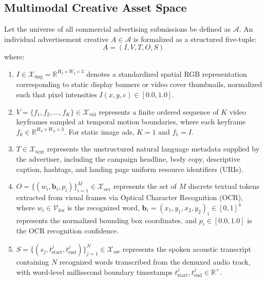 \documentclass[12pt,a4paper]{report}
\begin{document}
\subsection{Multimodal Creative Asset Space}
Let the universe of all commercial advertising submissions be defined as $\mathcal{A}$. An individual advertisement creative $A \in \mathcal{A}$ is formalized as a structured five-tuple:
\begin{equation}
A = \left( I, V, T, O, S \right)
\end{equation}
where:
\begin{enumerate}
    \item $I \in \mathcal{X}_{\text{img}} = \mathbb{R}^{H_I \times W_I \times 3}$ denotes a standardized spatial RGB representation corresponding to static display banners or video cover thumbnails, normalized such that pixel intensities $I(x,y,c) \in [0.0, 1.0]$.
    \item $V = \{f_1, f_2, \dots, f_K\} \in \mathcal{X}_{\text{vid}}$ represents a finite ordered sequence of $K$ video keyframes sampled at temporal motion boundaries, where each keyframe $f_k \in \mathbb{R}^{H_V \times W_V \times 3}$. For static image ads, $K=1$ and $f_1 = I$.
    \item $T \in \mathcal{X}_{\text{text}}$ represents the unstructured natural language metadata supplied by the advertiser, including the campaign headline, body copy, descriptive caption, hashtags, and landing page uniform resource identifiers (URIs).
    \item $O = \{(w_i, \mathbf{b}_i, p_i)\}_{i=1}^M \in \mathcal{X}_{\text{ocr}}$ represents the set of $M$ discrete textual tokens extracted from visual frames via Optical Character Recognition (OCR), where $w_i \in \mathcal{V}_{\text{lex}}$ is the recognized word, $\mathbf{b}_i = (x_1, y_1, x_2, y_2)_i \in [0, 1]^4$ represents the normalized bounding box coordinates, and $p_i \in [0.0, 1.0]$ is the OCR recognition confidence.
    \item $S = \{(s_j, t_{\text{start}}^j, t_{\text{end}}^j)\}_{j=1}^N \in \mathcal{X}_{\text{asr}}$ represents the spoken acoustic transcript containing $N$ recognized words transcribed from the demuxed audio track, with word-level millisecond boundary timestamps $t_{\text{start}}^j, t_{\text{end}}^j \in \mathbb{R}^+$.
\end{enumerate}
\end{document}
